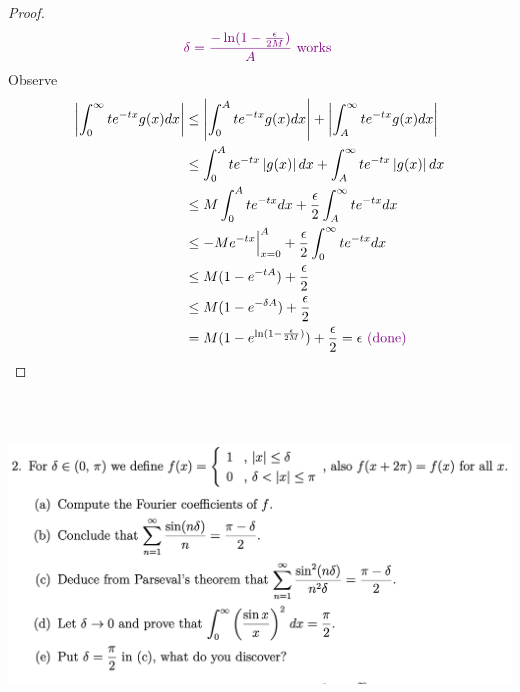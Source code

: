 \documentclass{report}
\begin{document}
\begin{proof}
 \begin{align*}
   \textcolor{violet}{\delta= \frac{-\ln (1-\frac{\epsilon}{2M})}{A}\text{ works }}
\end{align*}
Observe 
\begin{align*}
  \left|\int_0^\infty te^{-tx}g(x)dx\right|&\leq \left|\int_0^A te^{-tx}g(x)dx\right|+\left|\int_A^\infty te^{-tx}g(x)dx\right|\\
  &\leq \int_0^A te^{-tx}\left|g(x)\right|dx+ \int_A^\infty te^{-tx}\left|g(x)\right|dx\\
  &\leq M\int_0^A te^{-tx}dx + \frac{\epsilon}{2}\int_A^\infty te^{-tx}dx\\
  &\leq  -Me^{-tx}\Big|_{x=0}^A +\frac{\epsilon}{2}\int_0^\infty te^{-tx}dx\\
  &\leq M(1-e^{-tA})+\frac{\epsilon}{2}\\
  &\leq M(1-e^{-\delta A})+\frac{\epsilon}{2}\\
  &=M(1-e^{\ln (1-\frac{\epsilon}{2M})})+\frac{\epsilon}{2}=\epsilon \textcolor{violet}{\text{ (done) }}
\end{align*}

\end{proof}
\begin{question}{}{}
\includegraphics[height=9cm,width=18cm]{ahw22}
\end{question}
\end{document}
